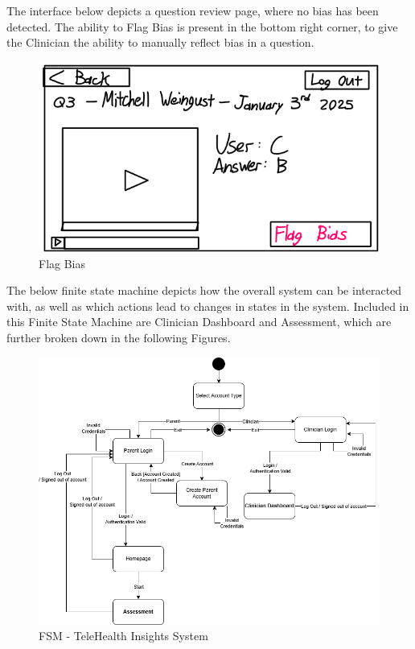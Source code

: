 \documentclass[12pt, titlepage]{article}
\begin{document}
\hspace{1.5em}The interface below depicts a question review page, where no bias has been detected. The ability to Flag Bias is present in the bottom right corner, to give the Clinician the ability to manually reflect bias in a question.
\begin{figure}[H]
  \centering
  \includegraphics[scale=0.9]{images/Flag-Bias.png}
  \caption{Flag Bias}
\end{figure}

\newpage

\hspace{1.5em}The below finite state machine depicts how the overall system can be interacted with, as well as which actions lead to changes in states in the system. Included in this Finite State Machine
              are Clinician Dashboard and Assessment, which are further broken down in the following Figures.
\begin{figure}[H]
  \centering
  \includegraphics[scale=0.6]{images/state_diagram.drawio.png}
  \caption{FSM - TeleHealth Insights System}
\end{figure}
\end{document}

